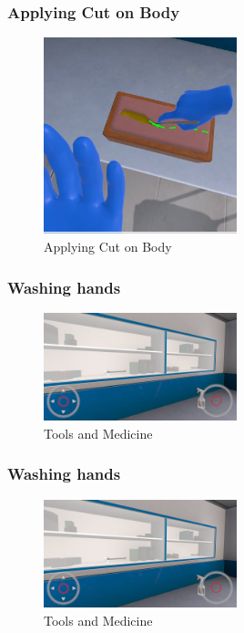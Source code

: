 \subsubsection{Applying Cut on Body}
\begin{figure}[h]
	\centering
	\includegraphics[width=0.5\textwidth, height=0.3\textheight]{Images/Applying Cut on Body.png}
	\caption{Applying Cut on Body}
	\label{fig:Applying Cut on Body}
\end{figure}

\subsubsection{Washing hands}
\begin{figure}[h]
	\centering
	\includegraphics[width=0.5\textwidth, height=0.3\textheight]{Images/Tools and Medicine.png}
	\caption{Tools and Medicine}
	\label{fig:system-diagram}
\end{figure}

\subsubsection{Washing hands}
\begin{figure}[h]
	\centering
	\includegraphics[width=0.5\textwidth, height=0.3\textheight]{Images/Tools and Medicine.png}
	\caption{Tools and Medicine}
	\label{fig:system-diagram}
\end{figure}

